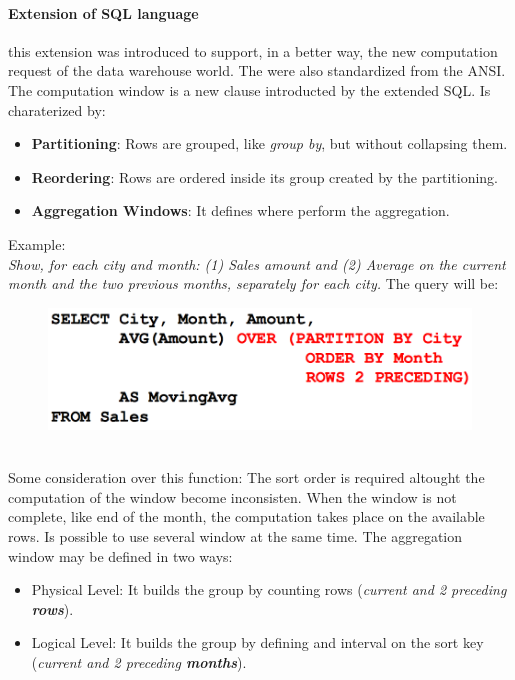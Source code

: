 \documentclass[12pt]{article}
\begin{document}
\paragraph{Extension of SQL language} this extension was introduced to support, in a better way, the new computation request of the data warehouse world. The were also standardized from the ANSI.\\
The computation window is a new clause introducted by the extended SQL. Is charaterized by:
\begin{itemize}
  \item \textbf{Partitioning}: Rows are grouped, like \textit{group by}, but without collapsing them.
  \item \textbf{Reordering}: Rows are ordered inside its group created by the partitioning.
  \item \textbf{Aggregation Windows}: It defines where perform the aggregation.
\end{itemize}
Example:\\
\textit{Show, for each city and month: (1) Sales amount and (2) Average on the current month and the two previous months, separately for each city.} The query will be:
\begin{figure}[hp!]
  \includegraphics[width=\linewidth]{images/avg.png}
\end{figure}\\
Some consideration over this function: The sort order is required altought the computation of the window become inconsisten. When the window is not complete, like end of the month, the computation takes place on the available rows. Is possible to use several window at the same time. The aggregation window may be defined in two ways:
\begin{itemize}
  \item Physical Level: It builds the group by counting rows (\textit{current and 2 preceding \textbf{rows}}).
  \item Logical Level: It builds the group by defining and interval on the sort key (\textit{current and 2 preceding \textbf{months}}).
\end{itemize}
\end{document}
